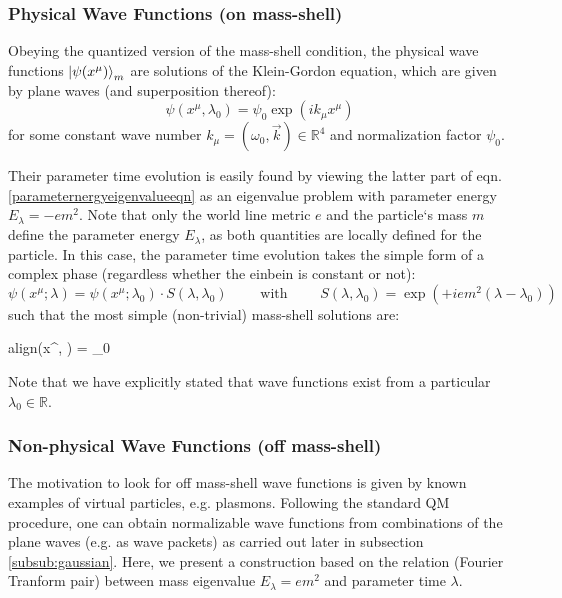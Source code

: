 \documentclass[twoside,a4paper,11pt]{article}
\numberwithin{equation}{section}
\newcommand{\boxedeq}[2]{\begin{empheq}[box={\fboxsep=6pt\fbox}]{align}\label{#1}#2\end{empheq}}
\begin{document}
\subsubsection{Physical Wave Functions (on mass-shell)}
Obeying the quantized version of the mass-shell condition, the physical wave functions $\ket{\psi(x^\mu)}_m $ are solutions of the Klein-Gordon equation, which are given by plane waves (and superposition thereof):
\begin{equation}
    \psi(x^\mu, \lambda_0) = \psi_0 \exp{\left( i k_\mu x^\mu \right)} 
\end{equation}
for some constant wave number $k_\mu = (\omega_0, \vec{k}) \in \mathbb{R}^4$ and normalization factor $\psi_0$. 

Their parameter time evolution is easily found by viewing the latter part of eqn. \ref{parameternergyeigenvalueeqn} as an eigenvalue problem with parameter energy $E_\lambda = -e m^2$. Note that only the world line metric $e$ and the particle`s mass $m$ define the parameter energy $E_\lambda$, as both quantities are locally defined for the particle. In this case, the parameter time evolution takes the simple form of a complex phase (regardless whether the einbein is constant or not):
\begin{equation}
    \psi (x^\mu; \lambda) = \psi(x^\mu; \lambda_0) \cdot S(\lambda, \lambda_0) \qquad \text{ with } \qquad  S(\lambda, \lambda_0) = \exp{\left( +i em^2 (\lambda - \lambda_0 )\right)}
\end{equation}
such that the most simple (non-trivial) mass-shell solutions are:
\boxedeq{eq:masshellsolutions}{\psi(x^\mu, \lambda) = \psi_0 \exp{\left( i k_\mu x^\mu \right) }\exp{\left( +i em^2 (\lambda - \lambda_0) \right)}}
Note that we have explicitly stated that wave functions exist from a particular $\lambda_0 \in \mathbb{R}$.

\subsubsection{Non-physical Wave Functions (off mass-shell)}
The motivation to look for off mass-shell wave functions is given by known examples of virtual particles, e.g. plasmons. Following the standard QM procedure, one can obtain normalizable wave functions from combinations of the plane waves (e.g. as wave packets) as carried out later in subsection \ref{subsub:gaussian}. Here, we present a construction based on the relation (Fourier Tranform pair) between mass eigenvalue $E_\lambda = em^2$ and parameter time $\lambda$.
\end{document}
